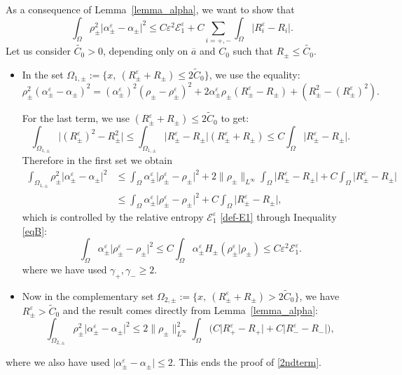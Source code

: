 \documentclass[11pt, twoside, a4paper]{article}
\theoremstyle{plain}
\theoremstyle{remark}
\numberwithin{equation}{section}
\def\EE{{\mathcal E}}
\renewcommand{\leq}{\leqslant}\renewcommand{\le}{\leqslant}
\renewcommand{\geq}{\geqslant}\renewcommand{\ge}{\geqslant}
\newcommand{\eps}{\varepsilon}
\newcommand{\gp}{\gamma_{+}}
\newcommand{\gm}{\gamma_-}
\begin{document}
As a consequence of Lemma~\ref{lemma_alpha}, we want to show that
\begin{equation}\label{2ndterm}
 \int_\Omega \rho_\pm^2 \lvert\alpha_\pm^\eps-\alpha_\pm \rvert^2 \leq C\eps^2 \EE^\eps_1 + C \sum_{i=+,-} \int_\Omega \lvert R_i^\eps - R_i \rvert.
\end{equation} 
Let us consider $\tilde{C_0}>0$, depending only on $\overline{a}$ and $C_0$ such that $R_\pm \leq \tilde{C_0}$.
\begin{itemize}
 \item In the set $\Omega_{1,\pm}:=\{x, \ (R_\pm^\eps + R_\pm) \leq 2\tilde C_0\}$, we use the equality:
\begin{equation*}
 \rho_\pm^2 \left(\alpha_\pm^\eps-\alpha_\pm \right)^2 = (\alpha_\pm^\eps)^2 \left(\rho_\pm-\rho_\pm^\eps\right)^2 + 2 \alpha_\pm^\eps \rho_\pm \left( R_\pm^\eps - R_\pm \right)+ \left(R_\pm^2 - (R_\pm^\eps)^2\right).
\end{equation*}

For the last term, we use $(R_\pm^\eps + R_\pm) \leq 2\tilde C_0$ to get:
\begin{equation*}
 \int_{\Omega_{1,\pm}} \lvert (R_\pm^\eps)^2 - R_\pm^2 \rvert \leq \int_{\Omega_{1,\pm}} \lvert R_\pm^\eps - R_\pm \rvert (R_\pm^\eps + R_\pm) \leq C \int_\Omega \lvert R_\pm^\eps - R_\pm \rvert.
\end{equation*}
Therefore in the first set we obtain
\begin{align*}
 \int_{\Omega_{1,\pm}} \rho_\pm^2 \lvert\alpha_\pm^\eps-\alpha_\pm \rvert^2 &\leq \int_\Omega \alpha_\pm^\eps \lvert \rho_\pm^\eps - \rho_\pm \rvert^2 + 2 \lVert \rho_\pm \rVert_{L^\infty} \int_\Omega \lvert R_\pm^\eps - R_\pm \rvert + C \int_\Omega \lvert R_\pm^\eps - R_\pm \rvert\nonumber \\
 &\leq \int_\Omega \alpha_\pm^\eps \lvert \rho_\pm^\eps - \rho_\pm \rvert^2+ C \int_\Omega \lvert R_\pm^\eps - R_\pm \rvert,
\end{align*}
which is controlled by the relative entropy $\EE^\eps_1$ \eqref{def-E1} through Inequality \eqref{eqB}:
\begin{equation*}
 \int_\Omega \alpha_\pm^\eps \lvert \rho_\pm^\eps - \rho_\pm \rvert^2 \leq C\int_{\Omega}\alpha_\pm^\eps H_\pm(\rho_\pm^\eps\vert \rho_\pm) 
 \leq C\eps^2 \EE^\eps_1.
\end{equation*}
where we have used $\gp, \gm \geq 2$.


\item Now in the complementary set $\Omega_{2,\pm} := \{x,\ (R_\pm^\eps + R_\pm) > 2\tilde C_0\}$, we have $R_\pm^\eps>\tilde C_0$ and the result comes directly from Lemma~\ref{lemma_alpha}:
\begin{equation*}
 \int_{\Omega_{2,\pm}} \rho_\pm^2 \lvert\alpha_\pm^\eps-\alpha_\pm \rvert^2 \leq 2 \lVert \rho_\pm \rVert_{L^\infty}^2 \int_\Omega \Big(C \lvert R_+^\eps - R_+ \rvert + C \lvert R_-^\eps - R_- \rvert\Big),
\end{equation*}
\end{itemize}
where we also have used $\lvert\alpha_\pm^\eps-\alpha_\pm \rvert \leq 2$.
This ends the proof of \eqref{2ndterm}.
\end{document}
